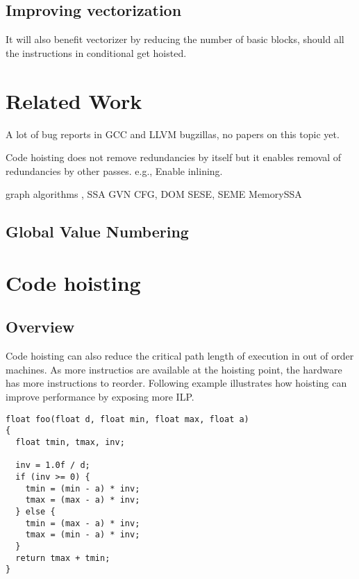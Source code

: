 \documentclass{sig-alternate}
\begin{document}
\subsection{Improving vectorization}
It will also benefit vectorizer by reducing the number
of basic blocks, should all the instructions in conditional get hoisted.



\section{Related Work}

A lot of bug reports in GCC and LLVM bugzillas, no papers on this topic yet.

Code hoisting does not remove redundancies by itself but it enables
removal of redundancies by other passes.  e.g., Enable inlining.


graph algorithms \cite{tarjan},
SSA \cite{cytron}
GVN \cite{rosen1988global,click1995global}
CFG, DOM \cite{dragonbook}
SESE, SEME \cite{sese}
MemorySSA \cite{novillo2007memory}

\subsection{Global Value Numbering}

\newpage

\section{Code hoisting}

\subsection{Overview}

Code hoisting can also reduce the critical path length of execution in out of
order machines. As more instructios are available at the hoisting point, the
hardware has more instructions to reorder. Following example illustrates how
hoisting can improve performance by exposing more ILP.

\begin{verbatim}
float foo(float d, float min, float max, float a)
{
  float tmin, tmax, inv;

  inv = 1.0f / d;
  if (inv >= 0) {
    tmin = (min - a) * inv;
    tmax = (max - a) * inv;
  } else {
    tmin = (max - a) * inv;
    tmax = (min - a) * inv;
  }
  return tmax + tmin;
}
\end{verbatim}
\end{document}
